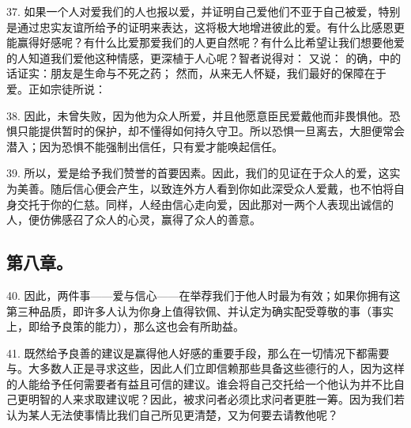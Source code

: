 37. 如果一个人对爱我们的人也报以爱，并证明自己爱他们不亚于自己被爱，特别是通过忠实友谊所给予的证明来表达，这将极大地增进彼此的爱。有什么比感恩更能赢得好感呢？有什么比爱那爱我们的人更自然呢？有什么比希望让我们想要他爱的人知道我们爱他这种情感，更深植于人心呢？智者说得对： 又说： 的确，中的话证实：朋友是生命与不死之药； 然而，从来无人怀疑，我们最好的保障在于爱。正如宗徒所说：\par

38. 因此，未曾失败，因为他为众人所爱，并且他愿意臣民爱戴他而非畏惧他。恐惧只能提供暂时的保护，却不懂得如何持久守卫。所以恐惧一旦离去，大胆便常会潜入；因为恐惧不能强制出信任，只有爱才能唤起信任。\par

39. 所以，爱是给予我们赞誉的首要因素。因此，我们的见证在于众人的爱，这实为美善。随后信心便会产生，以致连外方人看到你如此深受众人爱戴，也不怕将自身交托于你的仁慈。同样，人经由信心走向爱，因此那对一两个人表现出诚信的人，便仿佛感召了众人的心灵，赢得了众人的善意。\par


\subsection{第八章。}

\par

40. 因此，两件事——爱与信心——在举荐我们于他人时最为有效；如果你拥有这第三种品质，即许多人认为你身上值得钦佩、并认定为确实配受尊敬的事（事实上，即给予良策的能力），那么这也会有所助益。\par

41. 既然给予良善的建议是赢得他人好感的重要手段，那么在一切情况下都需要与。大多数人正是寻求这些，因此人们立即信赖那些具备这些德行的人，因为这样的人能给予任何需要者有益且可信的建议。谁会将自己交托给一个他认为并不比自己更明智的人来求取建议呢？因此，被求问者必须比求问者更胜一筹。因为我们若认为某人无法使事情比我们自己所见更清楚，又为何要去请教他呢？\par

